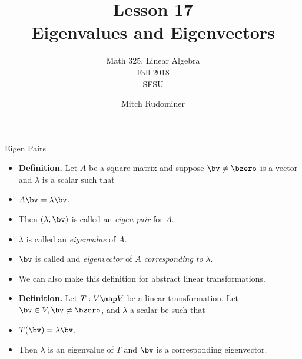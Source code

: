 \documentclass{beamer}
\title{Lesson 17 \\ Eigenvalues and Eigenvectors}
\subtitle{Math 325, Linear Algebra \\ Fall 2018 \\ SFSU}
\author{Mitch Rudominer}
\date{}
\begin{document}
\begin{frame}
  \titlepage
\end{frame}


\begin{frame}{Eigen Pairs}

\begin{itemize}
\item \textbf{Definition.} Let $A$ be a square matrix and suppose $\bv\not=\bzero$ is a vector and $\lambda$ is a scalar such that
\item $A\bv=\lambda\bv$.
\item Then $\left(\lambda, \bv \right)$ is called an \emph{eigen pair} for $A$.
\item $\lambda$ is called an \emph{eigenvalue} of $A$.
\item $\bv$ is called and \emph{eigenvector} of $A$ \emph{corresponding to} $\lambda$.
\item We can also make this definition for abstract linear transformations.
\item \textbf{Definition.} Let $T:V\map V$ be a linear transformation. Let $\bv\in V, \bv\not=\bzero$, and $\lambda$ a scalar be such that
\item $T(\bv)=\lambda\bv$.
\item Then $\lambda$ is an eigenvalue of $T$  and $\bv$ is a corresponding eigenvector.
\end{itemize}
\end{frame}

\end{document}
